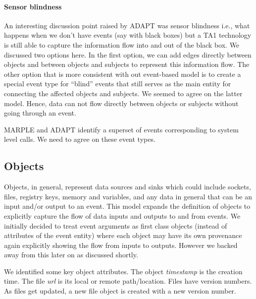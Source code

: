 \documentclass[10pt, conference, onecolumn]{IEEEtran}
\begin{document}
\paragraph{Sensor blindness} An interesting discussion point raised by ADAPT was sensor blindness i.e., what happens when we don't have events (say with black boxes) but a TA1 technology is still able to capture the information flow into and out of the black box. We discussed two options here. In the first option, we can add edges directly between objects and between objects and subjects to represent this information flow. The other option that is more consistent with out event-based model is to create a special event type for ``blind'' events that still serves as the main entity for connecting the affected objects and subjects. We seemed to agree on the latter model. Hence, data can not flow directly between objects or subjects without going through an event. 

MARPLE and ADAPT identify a superset of events corresponding to system level calls. We need to agree on these event types. 

\subsection{Objects}\label{sec:objects}
Objects, in general, represent data sources and sinks which could include sockets, files, registry keys, memory and variables, and any data in general that can be an input and/or output to an event. This model expands the definition of objects to explicitly capture the flow of data inputs and outputs to and from events. 
We initially decided to treat event arguments as first class objects (instead of attributes of the event entity) where each object may have its own provenance again explicitly showing the flow from inputs to outputs. However we backed away from this later on as discussed shortly.

We identified some key object attributes. The object \textit{timestamp} is the creation time.  The file \textit{url} is its local or remote path/location. Files have version numbers. As files get updated, a new file object is created with a new version number. 
\end{document}
